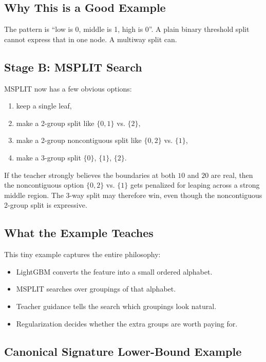\documentclass[11pt]{article}
\begin{document}
\subsection{Why This is a Good Example}

The pattern is ``low is 0, middle is 1, high is 0''. A plain binary threshold split cannot express that in one node. A multiway split can.

\subsection{Stage B: MSPLIT Search}

MSPLIT now has a few obvious options:

\begin{enumerate}
\item keep a single leaf,
\item make a 2-group split like \(\{0,1\}\) vs. \(\{2\}\),
\item make a 2-group noncontiguous split like \(\{0,2\}\) vs. \(\{1\}\),
\item make a 3-group split \(\{0\}\), \(\{1\}\), \(\{2\}\).
\end{enumerate}

If the teacher strongly believes the boundaries at both \(10\) and \(20\) are real, then the noncontiguous option \(\{0,2\}\) vs. \(\{1\}\) gets penalized for leaping across a strong middle region. The 3-way split may therefore win, even though the noncontiguous 2-group split is expressive.

\subsection{What the Example Teaches}

This tiny example captures the entire philosophy:

\begin{itemize}
\item LightGBM converts the feature into a small ordered alphabet.
\item MSPLIT searches over groupings of that alphabet.
\item Teacher guidance tells the search which groupings look natural.
\item Regularization decides whether the extra groups are worth paying for.
\end{itemize}

\subsection{Canonical Signature Lower-Bound Example}
\end{document}
